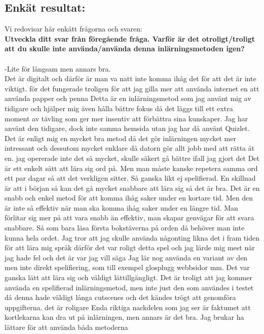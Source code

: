 \documentclass[11p]{article}
\begin{document}
\subsection{Enkät resultat:}
Vi redovisar här enkätt frågorna och svaren:
\\
\textbf{Utveckla ditt svar från föregående fråga. Varför är det otroligt/troligt att du skulle inte använda/använda denna inlärningsmetoden igen?}
\\
\\
-Lite för långsam men annars bra.\\
Det är digitalt och därför är man va natt inte komma ihåg det för att det är inte viktigt.
för det fungerade
troligen för att jag gilla mer att använda internet en att använda papper och penna
Detta är en inlärningsmetod som jag använt mig av tidigare och hjälper mig även hålla bättre fokus då det läggs till ett extra moment av tävling som ger mer insentiv att förbättra sina kunskaper.
Jag har använt den tidigare, dock inte samma hemsida utan jag har då använt Quizlet. Det är enligt mig en mycket bra metod då det gör inlärningen mycket mer intressant och dessutom mycket enklare då datorn gör allt jobb med att rätta åt en.
jag opererade inte det så mycket, skulle säkert gå bättre ifall jag gjort det
Det är ett enkelt sätt att lära sig ord på. Men man måste kanske repetera samma ord ett par dagar så att det verkligen sitter. Så ganska likt ej spelifierad. En skillnad är att i början så kan det gå mycket snabbare att lära sig så det är bra.
Det är en snabb och enkel metod för att komma ihåg saker under en kortare tid. Men den är inte så effektiv när man ska komma ihåg saker under en längre tid. Man förlitar sig mer på att vara snabb än effektiv, man skapar genvägar för att svara snabbare. Så som bara läsa första bokstäverna på orden då behöver man inte kunna hela ordet.
Jag tror att jag skulle använda någonting likna det i fram tiden för att lära mig språk därför det var roligt detta spel och jag lärde mig mest när jag hade fel och det är var jag vill säga
Jag lär nog använda en variant av den men inte direkt spelifiering, som till exempel glosplugg  webbsidor mm.
Det var ganska lätt att lära sig och väldigt lättillgängligt.
Det är troligt att jag kommer använda en spelifierad inlärningsmetod, men inte just den som användes i testet då denna hade väldigt långa cutscenes och det kändes trögt att genomföra uppgifterna.
det är roligare
Enda riktiga nackdelen som jag ser är faktumet att kortlekarna kan dra ut på inlärningen, men annars är det bra.
Jag brukar ha lättare för att använda båda metoderna
\end{document}
